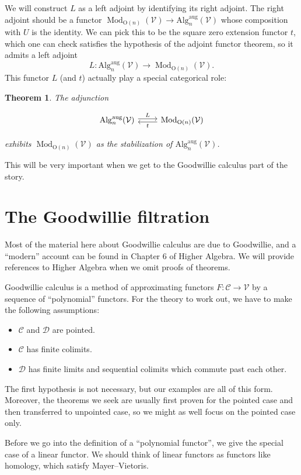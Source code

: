 \documentclass{shortart}
\newtheorem{thm}[lemma]{Theorem}
\theoremstyle{definition}
\DeclareMathOperator\Mod{Mod}
\newcommand\Algn{\mathrm{Alg}_n^{\mathrm{aug}}(\mathcal{V})}
\renewcommand\O{\mathrm{O}}
\begin{document}
We will construct $L$ as a left adjoint by identifying its right adjoint. The right adjoint should be a functor $\Mod_{\O(n)}(\mathcal{V}) \to \Algn$ whose composition with $U$ is the identity. We can pick this to be the square zero extension functor $t$, which one can check satisfies the hypothesis of the adjoint functor theorem, so it admits a left adjoint
\[
  L\colon \Algn \to \Mod_{\O(n)}(\mathcal{V}).
\]
This functor $L$ (and $t$) actually play a special categorical role:
\begin{thm}
  The adjunction
  \begin{useimager}
    \[
      \begin{tikzcd}
        \Algn \ar[r, yshift=2, "L"] & \Mod_{\O(n)}(\mathcal{V}) \ar[l, yshift=-2, "t"]
      \end{tikzcd}
    \]
  \end{useimager}
  exhibits $\Mod_{\O(n)}(\mathcal{V})$ as the stabilization of $\Algn$.
\end{thm}
This will be very important when we get to the Goodwillie calculus part of the story.

\section{The Goodwillie filtration}
Most of the material here about Goodwillie calculus are due to Goodwillie, and a ``modern'' account can be found in Chapter 6 of Higher Algebra. We will provide references to Higher Algebra when we omit proofs of theorems.

Goodwillie calculus is a method of approximating functors $F\colon \mathcal{C} \to \mathcal{V}$ by a sequence of ``polynomial'' functors. For the theory to work out, we have to make the following assumptions:
\begin{itemize}
  \item $\mathcal{C}$ and $\mathcal{D}$ are pointed.
  \item $\mathcal{C}$ has finite colimits.
  \item $\mathcal{D}$ has finite limits and sequential colimits which commute past each other.
\end{itemize}
The first hypothesis is not necessary, but our examples are all of this form. Moreover, the theorems we seek are usually first proven for the pointed case and then transferred to unpointed case, so we might as well focus on the pointed case only.

Before we go into the definition of a ``polynomial functor'', we give the special case of a linear functor. We should think of linear functors as functors like homology, which satisfy Mayer--Vietoris.
\end{document}
